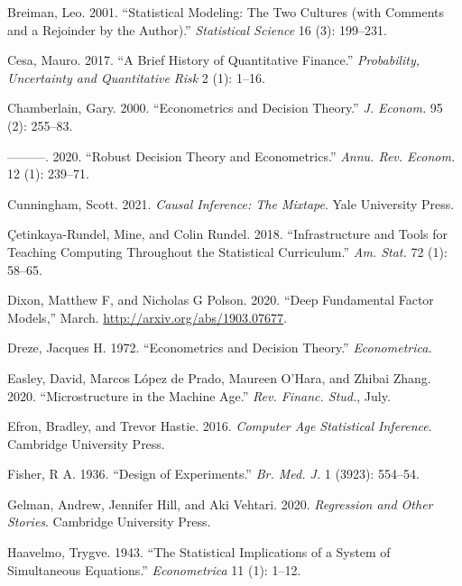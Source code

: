 \documentclass{article}
\begin{document}
\leavevmode\hypertarget{ref-Breiman2001}{}%
Breiman, Leo. 2001. ``Statistical Modeling: The Two Cultures (with
Comments and a Rejoinder by the Author).'' \emph{Statistical Science} 16
(3): 199--231.

\leavevmode\hypertarget{ref-Cesa2017}{}%
Cesa, Mauro. 2017. ``A Brief History of Quantitative Finance.''
\emph{Probability, Uncertainty and Quantitative Risk} 2 (1): 1--16.

\leavevmode\hypertarget{ref-Chamberlain2000}{}%
Chamberlain, Gary. 2000. ``Econometrics and Decision Theory.'' \emph{J.
Econom.} 95 (2): 255--83.

\leavevmode\hypertarget{ref-Chamberlain2020}{}%
---------. 2020. ``Robust Decision Theory and Econometrics.''
\emph{Annu. Rev. Econom.} 12 (1): 239--71.

\leavevmode\hypertarget{ref-Cunningham2021}{}%
Cunningham, Scott. 2021. \emph{Causal Inference: The Mixtape}. Yale
University Press.

\leavevmode\hypertarget{ref-Cetinkaya-Rundel2018}{}%
Çetinkaya-Rundel, Mine, and Colin Rundel. 2018. ``Infrastructure and
Tools for Teaching Computing Throughout the Statistical Curriculum.''
\emph{Am. Stat.} 72 (1): 58--65.

\leavevmode\hypertarget{ref-Dixon2020}{}%
Dixon, Matthew F, and Nicholas G Polson. 2020. ``Deep Fundamental Factor
Models,'' March. \url{http://arxiv.org/abs/1903.07677}.

\leavevmode\hypertarget{ref-Dreze1972}{}%
Dreze, Jacques H. 1972. ``Econometrics and Decision Theory.''
\emph{Econometrica}.

\leavevmode\hypertarget{ref-Easley2020}{}%
Easley, David, Marcos López de Prado, Maureen O'Hara, and Zhibai Zhang.
2020. ``Microstructure in the Machine Age.'' \emph{Rev. Financ. Stud.},
July.

\leavevmode\hypertarget{ref-Efron2016}{}%
Efron, Bradley, and Trevor Hastie. 2016. \emph{Computer Age Statistical
Inference}. Cambridge University Press.

\leavevmode\hypertarget{ref-Fisher1936}{}%
Fisher, R A. 1936. ``Design of Experiments.'' \emph{Br. Med. J.} 1
(3923): 554--54.

\leavevmode\hypertarget{ref-Gelman2020}{}%
Gelman, Andrew, Jennifer Hill, and Aki Vehtari. 2020. \emph{Regression
and Other Stories}. Cambridge University Press.

\leavevmode\hypertarget{ref-Haavelmo1943}{}%
Haavelmo, Trygve. 1943. ``The Statistical Implications of a System of
Simultaneous Equations.'' \emph{Econometrica} 11 (1): 1--12.
\end{document}
